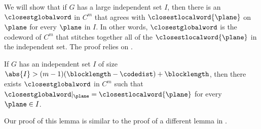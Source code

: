 \documentclass{toc}
\theoremstyle{plain}
\begin{document}
We will show that if $G$ has a large independent set $I$, then there is an $\closestglobalword$ in $C^m$ that agrees with $\closestlocalword{\plane}$ on $\plane$ for every $\plane$ in $I$. In other words, $\closestglobalword$ is the codeword of $C^m$ that stitches together all of the
%
$\closestlocalword{\plane}$      %
in the independent set. The proof relies on .
\begin{lemma}[Interpolation]\label{lemma:interp}
If $G$ has an independent set $I$ of size $\abs{I} > (m-1)(\blocklength-\codedist) + \blocklength$, then there exists $\closestglobalword$ in $C^m$ such that $\closestglobalword \vert_{\plane} = \closestlocalword{\plane}$ for every $\plane \in I$.
\end{lemma}
\noindent
Our proof of this lemma is similar to the proof of a different lemma in \cite{Ben-SassonS06}.
\end{document}
